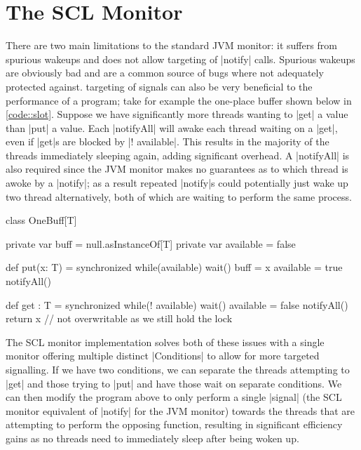 \section{The SCL Monitor}


There are two main limitations to the standard JVM monitor: it suffers from spurious wakeups and does not allow targeting of |notify| calls. Spurious wakeups are obviously bad and are a common source of bugs where not adequately protected against. targeting of signals can also be very beneficial to the performance of a program; take for example the one-place buffer shown below in \ref{code::slot}. Suppose we have significantly more threads wanting to |get| a value than |put| a value. Each |notifyAll| will awake each thread waiting on a |get|, even if |get|s are blocked by |! available|. This results in the majority of the threads immediately sleeping again, adding significant overhead. A |notifyAll| is also required since the JVM monitor makes no guarantees as to which thread is awoke by a |notify|; as a result repeated |notify|s could potentially just wake up two thread alternatively, both of which are waiting to perform the same process.

\begin{scala}[label=code::slot, caption={Single placed buffer as an example of the inefficiency of untargeted signals}]
  class OneBuff[T] {
    private var buff = null.asInstanceOf[T]
    private var available = false

    def put(x: T) = synchronized {
      while(available) wait()
      buff = x
      available = true
      notifyAll()
    }

    def get : T = synchronized {
      while(! available) wait()
      available = false
      notifyAll()
      return x // not overwritable as we still hold the lock
    }
  }
\end{scala}

The SCL monitor implementation solves both of these issues with a single monitor offering multiple distinct |Conditions| to allow for more targeted signalling. 
If we have two conditions, we can separate the threads attempting to |get| and those trying to |put| and have those wait on separate conditions. We can then modify the program above to only perform a single |signal| (the SCL monitor equivalent of |notify| for the JVM monitor) towards the threads that are attempting to perform the opposing function, resulting in significant efficiency gains as no threads need to immediately sleep after being woken up.

